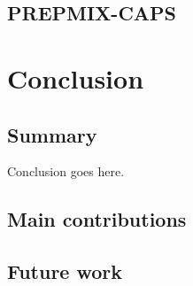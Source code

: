 \documentclass{statsmsc}
\begin{document}

\section{PREPMIX-CAPS}%
\label{sec:PREPMIX-CAPS}



\chapter{Conclusion} %

\section{Summary}%
\label{sec:Summary}



Conclusion goes here. 




\section{Main contributions}%
\label{sec:Main contributions}



\section{Future work}%
\label{sec:Future work}


\clearpage
\renewcommand*{\thepage}{A\arabic{page}}

%
%






\end{document}
